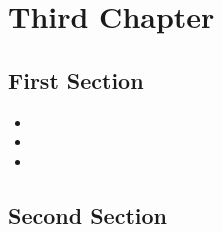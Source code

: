 \documentclass[a4paper,12pt,landscape,twocolumn]{book}
\begin{document}
	\chapter{Third Chapter}
	\blindmathtrue
	\blindtext[5]
	\section{First Section}
	\blindtext[3]
	\begin{itemize}
		\item \blindtext
		\item \blindtext
		\item \blindtext
	\end{itemize}
	\section{Second Section}
	\blindtext[2]
\end{document}
